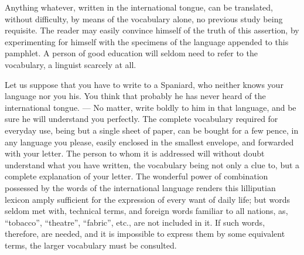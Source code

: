 \documentclass[12pt,twoside]{book}
\begin{document}
Anything whatever, written in the international tongue, can be translated, without difficulty, by means of the vocabulary alone, no previous study being requisite. The reader may easily convince himself of the truth of this assertion, by experimenting for himself with the specimens of the language appended to this pamphlet. A person of good education will seldom need to refer to the vocabulary, a linguist scarcely at all.

Let us suppose that you have to write to a Spaniard, who neither knows your language nor you his. You think that probably he has never heard of the international tongue. --- No matter, write boldly to him in that language, and be sure he will understand you perfectly. The complete vocabulary required for everyday use, being but a single sheet of paper, can be bought for a few pence, in any language you please, easily enclosed in the smallest envelope, and forwarded with your letter. The person to whom it is addressed will without doubt understand what you have written, the vocabulary being not only a clue to, but a complete explanation of your letter. The wonderful power of combination possessed by the words of the international language renders this lilliputian lexicon amply sufficient for the expression of every want of daily life; but words seldom met with, technical terms, and foreign words familiar to all nations, as, “tobacco”, “theatre”, “fabric”, etc., are not included in it. If such words, therefore, are needed, and it is impossible to express them by some equivalent terms, the larger vocabulary must be consulted.
\end{document}
